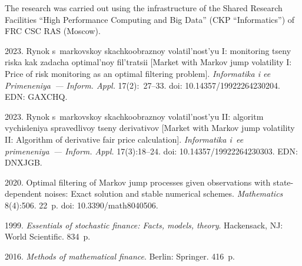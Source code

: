 




\vspace*{-12pt}

\Ack
\noindent
The research was carried out using the infrastructure of the Shared Research Facilities ``High Performance Computing and Big Data'' 
(CKP ``Informatics'') of FRC CSC RAS (Moscow).


  \begin{multicols}{2}

\renewcommand{\bibname}{\protect\rmfamily References}

{\small\frenchspacing
 {%
 \begin{thebibliography}{99} 

 2023. Rynok s~markovskoy skachkoobraznoy volatil'nost'yu I: monitoring tseny riska kak zadacha optimal'noy fil'tratsii 
[Market with Markov jump volatility I: Price of risk monitoring as an optimal filtering problem]. \textit{Informatika i ee Primeneniya~--- 
Inform. Appl.} 17(2):~27--33. doi: 10.14357/19922264230204. EDN: GAXCHQ.

 2023. Rynok s~markovskoy skachkoobraznoy volatil'nost'yu II: algoritm vychisleniya spravedlivoy tseny derivativov 
[Market with Markov jump volatility II: Algorithm of derivative fair price calculation].
\textit{Informatika i~ee primeneniya~--- Inform. Appl.} 17(3):18--24. doi: 10.14357/19922264230303. EDN: DNXJGB.

 2020. Optimal filtering of Markov jump processes given observations with state-dependent noises: Exact solution and stable numerical schemes. 
 \textit{Mathematics} 8(4):506. 22~p. doi: 10.3390/math8040506.

 1999. \textit{Essentials of stochastic finance: Facts, models, theory}. Hackensack, NJ: World Scientific. 834~p.

 2016. \textit{Methods of mathematical finance}. Berlin: Springer. 416~p.


\end{thebibliography}}}
\end{multicols}

